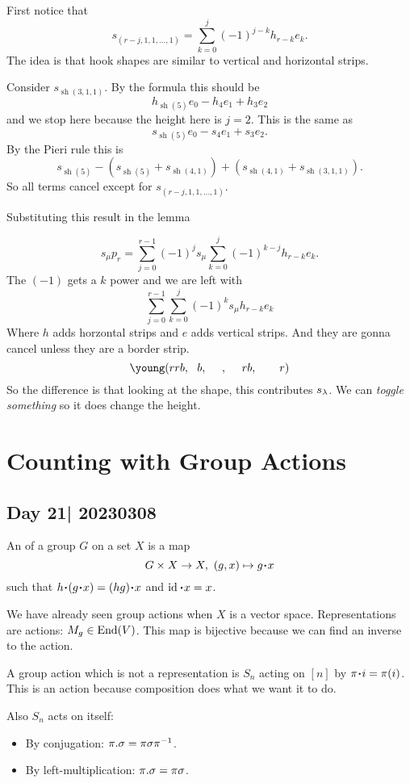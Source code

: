 \documentclass[12pt]{memoir}
\DeclareMathOperator{\sh}{sh}
\begin{document}
\begin{ptcbp}
    First notice that 
    $$s_{(r-j,1,1,\dots,1)}=\sum_{k=0}^{j}(-1)^{j-k}h_{r-k}e_k.$$
    The idea is that hook shapes are similar to vertical and horizontal strips.
\end{ptcbp}

\begin{Ex}
    Consider $s_{\sh(3,1,1)}$. By the formula this should be 
    $$h_{\sh(5)}e_0-h_4e_1+h_3e_2$$
     and we stop here because the height here is $j=2$. This is the same as 
    $$s_{\sh(5)}e_0-s_4e_1+s_3e_2.$$
    By the Pieri rule this is  
    $$s_{\sh(5)}-(s_{\sh(5)}+s_{\sh(4,1)})+(s_{\sh(4,1)}+s_{\sh(3,1,1)}).$$
    So all terms cancel except for $s_{(r-j,1,1,\dots,1)}$.
\end{Ex}

Substituting this result in the lemma

$$s_\mu p_r=\sum_{j=0}^{r-1}(-1)^js_\mu\sum_{k=0}^{j}(-1)^{k-j}h_{r-k}e_k.$$
The $(-1)$ gets a $k$ power and we are left with 
$$\sum_{j=0}^{r-1}\sum_{k=0}^{j}(-1)^ks_\mu h_{r-k}e_k$$
Where $h$ adds horzontal strips and $e$ adds vertical strips. And they are gonna cancel unless they are a border strip. 
$$\young(rrb,~~b,~~~~,~~~~rb,~~~~~~r)$$
So the difference is that looking at the shape, this contributes $s_\lambda$. We can \emph{toggle something} so it does change the height. 

\chapter{Counting with Group Actions}
\section{Day 21| 20230308}

\begin{Def}
    An  of a group $G$ on a set $X$ is a map 
    $$G\x X\to X,\ (g,x)\mapsto g\.x$$
    such that $h\.(g\. x)=(hg)\.x$ and $\id\. x=x$.
\end{Def}

We have already seen group actions when $X$ is a vector space. Representations are actions: $M_g\in\operatorname{End}(V)$. This map is bijective because we can find an inverse to the action.

\begin{Ex}
    A group action which is not a representation is $S_n$ acting on $[n]$ by $\pi\. i=\pi(i)$. This is an action because composition does what we want it to do.\par 
    Also $S_n$ acts on itself:
    \vspace*{-0.4em}
    \begin{itemize}
        \itemsep=-0.4em
        \item By conjugation: $\pi.\sigma=\pi\sigma\pi^{-1}$.
        \item By left-multiplication: $\pi.\sigma=\pi\sigma$.
    \end{itemize}
\end{Ex}
\end{document}
